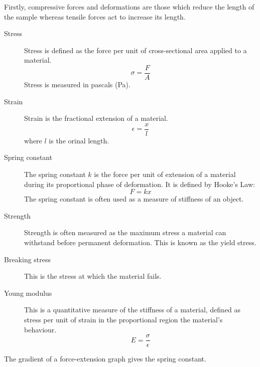 \documentclass[main.tex]{subfiles}
\begin{document}

Firstly, compressive forces and deformations are those which reduce the length of the sample whereas tensile forces act to increase its length.

\begin{description}
    \item[Stress] Stress is defined as the force per unit of cross-sectional area applied to a material. \[ \sigma = \frac{F}{A} \] Stress is measured in pascals (Pa).
    \item[Strain] Strain is the fractional extension of a material. \[ \epsilon = \frac{x}{l} \]
    where $l$ is the orinal length.
    \item[Spring constant] The spring constant $k$ is the force per unit of extension of a material during its proportional phase of deformation. It is defined by Hooke's Law: \[ F = kx\] The spring constant is often used as a measure of stiffness of an object.
    \item[Strength] Strength is often measured as the maximum stress a material can withstand before permanent deformation. This is known as the yield stress.
    \item[Breaking stress] This is the stress at which the material fails.
    \item[Young modulus] This is a quantitative measure of the stiffness of a material, defined as stress per unit of strain in the proportional region the material's behaviour. \[ E = \frac{\sigma}{\epsilon} \]
\end{description}


The gradient of a force-extension graph gives the spring constant.
\end{document}

